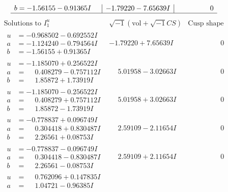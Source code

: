 \documentclass[1p]{elsarticle_modified}
\theoremstyle{definition}
\newcommand{\I}{\sqrt{-1}}
\begin{document}
$$\begin{array}{c|c|c}
\begin{aligned}
b &= -1.56155 - 0.91365 I\end{aligned}
 & -1.79220 - 7.65639 I & \phantom{-0.000000 } 0\\
 \hline 
 \end{array}$$\newpage$$\begin{array}{c|c|c}  
\text{Solutions to }I^u_{1}& \I (\text{vol} + \sqrt{-1}CS) & \text{Cusp shape}\\
 \hline 
\begin{aligned}
u &= -0.968502 - 0.692552 I \\
a &= -1.124240 - 0.794564 I \\
b &= -1.56155 + 0.91365 I\end{aligned}
 & -1.79220 + 7.65639 I & \phantom{-0.000000 } 0 \\ \hline\begin{aligned}
u &= -1.185070 + 0.256522 I \\
a &= \phantom{-}0.408279 - 0.757112 I \\
b &= \phantom{-}1.85872 + 1.73919 I\end{aligned}
 & \phantom{-}5.01958 - 3.02663 I & \phantom{-0.000000 } 0 \\ \hline\begin{aligned}
u &= -1.185070 - 0.256522 I \\
a &= \phantom{-}0.408279 + 0.757112 I \\
b &= \phantom{-}1.85872 - 1.73919 I\end{aligned}
 & \phantom{-}5.01958 + 3.02663 I & \phantom{-0.000000 } 0 \\ \hline\begin{aligned}
u &= -0.778837 + 0.096749 I \\
a &= \phantom{-}0.304418 + 0.830487 I \\
b &= \phantom{-}2.26561 + 0.08753 I\end{aligned}
 & \phantom{-}2.59109 - 2.11654 I & \phantom{-0.000000 } 0 \\ \hline\begin{aligned}
u &= -0.778837 - 0.096749 I \\
a &= \phantom{-}0.304418 - 0.830487 I \\
b &= \phantom{-}2.26561 - 0.08753 I\end{aligned}
 & \phantom{-}2.59109 + 2.11654 I & \phantom{-0.000000 } 0 \\ \hline\begin{aligned}
u &= \phantom{-}0.762096 + 0.147835 I \\
a &= \phantom{-}1.04721 - 0.96385 I \\

\end{aligned}
\end{array}$$
\end{document}

